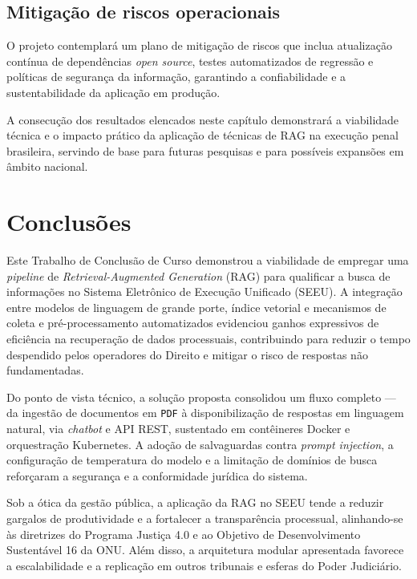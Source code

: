 \begin{description}
\section{Mitigação de riscos operacionais}
O projeto contemplará um plano de mitigação de riscos que inclua atualização contínua de dependências \emph{open source}, testes automatizados de regressão e políticas de segurança da informação, garantindo a confiabilidade e a sustentabilidade da aplicação em produção.

A consecução dos resultados elencados neste capítulo demonstrará a viabilidade técnica e o impacto prático da aplicação de técnicas de RAG na execução penal brasileira, servindo de base para futuras pesquisas e para possíveis expansões em âmbito nacional.


\chapter{Conclusões}
\label{chap:conclusoes}

Este Trabalho de Conclusão de Curso demonstrou a viabilidade de empregar uma \textit{pipeline} de \textit{Retrieval-Augmented Generation} (RAG) para qualificar a busca de informações no Sistema Eletrônico de Execução Unificado (SEEU). A integração entre modelos de linguagem de grande porte, índice vetorial e mecanismos de coleta e pré-processamento automatizados evidenciou ganhos expressivos de eficiência na recuperação de dados processuais, contribuindo para reduzir o tempo despendido pelos operadores do Direito e mitigar o risco de respostas não fundamentadas.

Do ponto de vista técnico, a solução proposta consolidou um fluxo completo — da ingestão de documentos em \texttt{PDF} à disponibilização de respostas em linguagem natural, via \textit{chatbot} e API REST, sustentado em contêineres Docker e orquestração Kubernetes. A adoção de salvaguardas contra \textit{prompt injection}, a configuração de temperatura do modelo e a limitação de domínios de busca reforçaram a segurança e a conformidade jurídica do sistema.

Sob a ótica da gestão pública, a aplicação da RAG no SEEU tende a reduzir gargalos de produtividade e a fortalecer a transparência processual, alinhando-se às diretrizes do Programa Justiça 4.0 e ao Objetivo de Desenvolvimento Sustentável 16 da ONU. Além disso, a arquitetura modular apresentada favorece a escalabilidade e a replicação em outros tribunais e esferas do Poder Judiciário.


\end{description}
